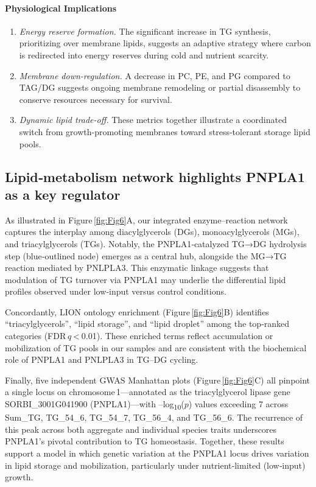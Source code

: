\documentclass[10pt,letterpaper]{article}
\begin{document}
\paragraph{Physiological Implications}
\begin{enumerate}
  \item \textit{Energy reserve formation.}  The significant increase in TG synthesis, prioritizing over membrane lipids, suggests an adaptive strategy where carbon is redirected into energy reserves during cold and nutrient scarcity.
  \item \textit{Membrane down-regulation.}  A decrease in PC, PE, and PG compared to TAG/DG suggests ongoing membrane remodeling or partial disassembly to conserve resources necessary for survival.
  \item \textit{Dynamic lipid trade-off.}  These metrics together illustrate a coordinated switch from growth-promoting membranes toward stress-tolerant storage lipid pools.
\end{enumerate}


\subsection*{Lipid‐metabolism network highlights PNPLA1 as a key regulator}

As illustrated in Figure \ref{fig:Fig6}A, our integrated enzyme–reaction network captures the interplay among diacylglycerols (DGs), monoacylglycerols (MGs), and triacylglycerols (TGs).  Notably, the PNPLA1‐catalyzed TG→DG hydrolysis step (blue‐outlined node) emerges as a central hub, alongside the MG→TG reaction mediated by PNLPLA3.  This enzymatic linkage suggests that modulation of TG turnover via PNPLA1 may underlie the differential lipid profiles observed under low‐input versus control conditions.

Concordantly, LION ontology enrichment (Figure \ref{fig:Fig6}B) identifies “triacylglycerols”, “lipid storage”, and “lipid droplet” among the top‐ranked categories (FDR $q$ < 0.01).  These enriched terms reflect accumulation or mobilization of TG pools in our samples and are consistent with the biochemical role of PNPLA1 and PNLPLA3 in TG–DG cycling.

Finally, five independent GWAS Manhattan plots (Figure \ref{fig:Fig6}C) all pinpoint a single locus on chromosome 1—annotated as the triacylglycerol lipase gene SORBI\_3001G041900 (PNPLA1)—with –log\textsubscript{10}($p$) values exceeding 7 across Sum\_TG, TG\_54\_6, TG\_54\_7, TG\_56\_4, and TG\_56\_6.  The recurrence of this peak across both aggregate and individual species traits underscores PNPLA1’s pivotal contribution to TG homeostasis.  Together, these results support a model in which genetic variation at the PNPLA1 locus drives variation in lipid storage and mobilization, particularly under nutrient‐limited (low‐input) growth.
\end{document}
